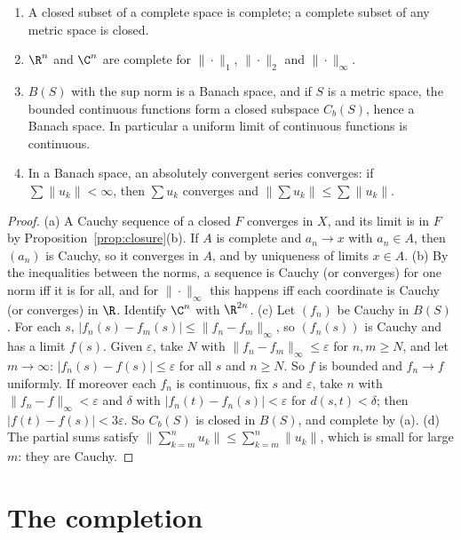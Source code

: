 \begin{proposition}\label{prop:complete}
\begin{enumerate}[label=(\alph*)]
\item A closed subset of a complete space is complete; a complete subset of any metric space is closed.
\item $\R^n$ and $\C^n$ are complete for $\|\cdot\|_1$, $\|\cdot\|_2$ and $\|\cdot\|_\infty$.
\item $B(S)$ with the sup norm is a Banach space, and if $S$ is a metric space, the bounded continuous functions form a
closed subspace $C_b(S)$, hence a Banach space. In particular a uniform limit of continuous functions is continuous.
\item In a Banach space, an absolutely convergent series converges: if $\sum\|u_k\|<\infty$, then $\sum u_k$ converges and
$\|\sum u_k\|\le\sum\|u_k\|$.
\end{enumerate}
\end{proposition}
\begin{proof}
(a) A Cauchy sequence of a closed $F$ converges in $X$, and its limit is in $F$ by Proposition~\ref{prop:closure}(b). If $A$ is complete and
$a_n\to x$ with $a_n\in A$, then $(a_n)$ is Cauchy, so it converges in $A$, and by uniqueness of limits $x\in A$.
(b) By the inequalities between the norms, a sequence is Cauchy (or converges) for one norm iff it is for all, and for $\|\cdot\|_\infty$
this happens iff each coordinate is Cauchy (or converges) in $\R$. Identify $\C^n$ with $\R^{2n}$.
(c) Let $(f_n)$ be Cauchy in $B(S)$. For each $s$, $|f_n(s)-f_m(s)|\le\|f_n-f_m\|_\infty$, so $(f_n(s))$ is Cauchy and has a limit $f(s)$. Given $\varepsilon$,
take $N$ with $\|f_n-f_m\|_\infty\le\varepsilon$ for $n,m\ge N$, and let $m\to\infty$: $|f_n(s)-f(s)|\le\varepsilon$ for all $s$ and $n\ge N$. So $f$ is bounded and
$f_n\to f$ uniformly. If moreover each $f_n$ is continuous, fix $s$ and $\varepsilon$, take $n$ with $\|f_n-f\|_\infty<\varepsilon$ and $\delta$ with
$|f_n(t)-f_n(s)|<\varepsilon$ for $d(s,t)<\delta$; then $|f(t)-f(s)|<3\varepsilon$. So $C_b(S)$ is closed in $B(S)$, and complete by (a).
(d) The partial sums satisfy $\|\sum_{k=m}^nu_k\|\le\sum_{k=m}^n\|u_k\|$, which is small for large $m$: they are Cauchy.
\end{proof}

\section{The completion}

